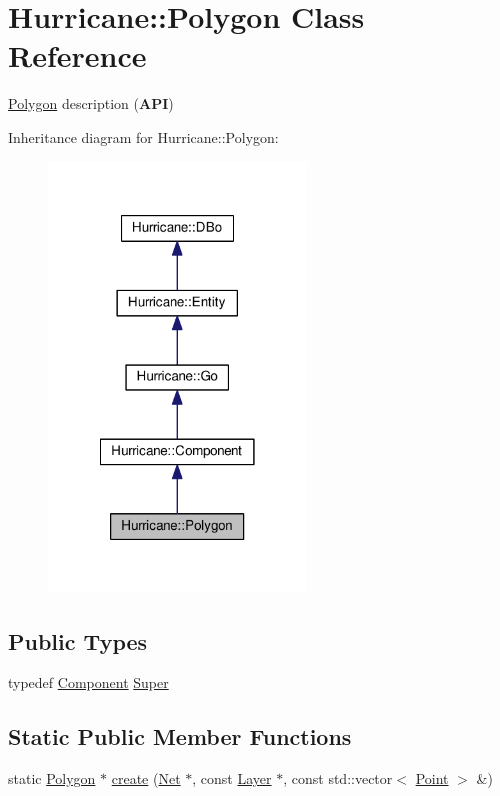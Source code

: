 \hypertarget{classHurricane_1_1Polygon}{}\section{Hurricane\+:\+:Polygon Class Reference}
\label{classHurricane_1_1Polygon}


\mbox{\hyperlink{classHurricane_1_1Polygon}{Polygon}} description ({\bfseries A\+PI})  




Inheritance diagram for Hurricane\+:\+:Polygon\+:\nopagebreak
\begin{figure}[H]
\begin{center}
\leavevmode
\includegraphics[width=194pt]{classHurricane_1_1Polygon__inherit__graph}
\end{center}
\end{figure}
\subsection*{Public Types}
\begin{DoxyCompactItemize}
\item 
typedef \mbox{\hyperlink{classHurricane_1_1Component}{Component}} \mbox{\hyperlink{classHurricane_1_1Polygon_adac4dcd1480b81e7778775540b95f81c}{Super}}
\end{DoxyCompactItemize}
\subsection*{Static Public Member Functions}
\begin{DoxyCompactItemize}
\item 
static \mbox{\hyperlink{classHurricane_1_1Polygon}{Polygon}} $\ast$ \mbox{\hyperlink{classHurricane_1_1Polygon_ac248679558ff51bf509b28050027b7da}{create}} (\mbox{\hyperlink{classHurricane_1_1Net}{Net}} $\ast$, const \mbox{\hyperlink{classHurricane_1_1Layer}{Layer}} $\ast$, const std\+::vector$<$ \mbox{\hyperlink{classHurricane_1_1Point}{Point}} $>$ \&)
\end{DoxyCompactItemize}
